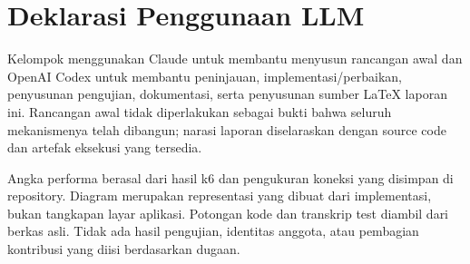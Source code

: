 \section{Deklarasi Penggunaan LLM}
\label{sec:ai}
Kelompok menggunakan Claude untuk membantu menyusun rancangan awal dan OpenAI Codex untuk membantu peninjauan, implementasi/perbaikan, penyusunan pengujian, dokumentasi, serta penyusunan sumber LaTeX laporan ini. Rancangan awal tidak diperlakukan sebagai bukti bahwa seluruh mekanismenya telah dibangun; narasi laporan diselaraskan dengan source code dan artefak eksekusi yang tersedia.

Angka performa berasal dari hasil k6 dan pengukuran koneksi yang disimpan di repository. Diagram merupakan representasi yang dibuat dari implementasi, bukan tangkapan layar aplikasi. Potongan kode dan transkrip test diambil dari berkas asli. Tidak ada hasil pengujian, identitas anggota, atau pembagian kontribusi yang diisi berdasarkan dugaan.

